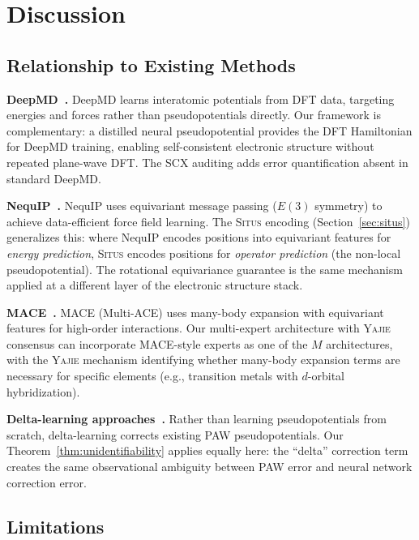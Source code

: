 \documentclass[11pt,a4paper]{article}
\theoremstyle{definition}
\newcommand{\Situs}{\textsc{Situs}}
\newcommand{\Yajie}{\textsc{Yajie}}
\newcommand{\SCX}{\textsc{SCX}}
\begin{document}
\section{Discussion }
\label{sec:discussion}

\subsection{Relationship to Existing Methods}

\textbf{DeepMD~\cite{Zhang2018,Wang2018}.} DeepMD learns interatomic potentials from DFT data, targeting energies and forces rather than pseudopotentials directly. Our framework is complementary: a distilled neural pseudopotential provides the DFT Hamiltonian for DeepMD training, enabling self-consistent electronic structure without repeated plane-wave DFT. The \SCX{} auditing adds error quantification absent in standard DeepMD.

\textbf{NequIP~\cite{Batzner2022}.} NequIP uses equivariant message passing ($E(3)$ symmetry) to achieve data-efficient force field learning. The \Situs{} encoding (Section~\ref{sec:situs}) generalizes this: where NequIP encodes positions into equivariant features for \textit{energy prediction}, \Situs{} encodes positions for \textit{operator prediction} (the non-local pseudopotential). The rotational equivariance guarantee is the same mechanism applied at a different layer of the electronic structure stack.

\textbf{MACE~\cite{Batatia2022}.} MACE (Multi-ACE) uses many-body expansion with equivariant features for high-order interactions. Our multi-expert architecture with \Yajie{} consensus can incorporate MACE-style experts as one of the $M$ architectures, with the \Yajie{} mechanism identifying whether many-body expansion terms are necessary for specific elements (e.g., transition metals with $d$-orbital hybridization).

\textbf{Delta-learning approaches~\cite{Ramakrishnan2015}.} Rather than learning pseudopotentials from scratch, delta-learning corrects existing PAW pseudopotentials. Our Theorem~\ref{thm:unidentifiability} applies equally here: the ``delta'' correction term creates the same observational ambiguity between PAW error and neural network correction error.

\subsection{Limitations }
\end{document}
